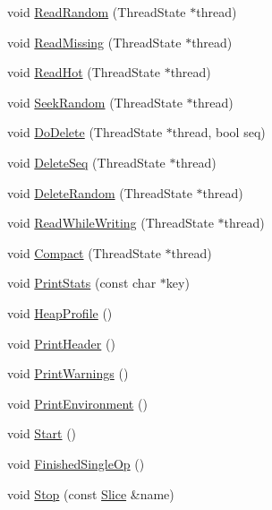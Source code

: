 \begin{DoxyCompactItemize}
\item 
void \hyperlink{classleveldb_1_1_benchmark_abef1498fff747eb738dd8d6ab438d3f7}{Read\+Random} (Thread\+State $\ast$thread)
\item 
void \hyperlink{classleveldb_1_1_benchmark_a03029862416a43d2e8c25b8615ba83a2}{Read\+Missing} (Thread\+State $\ast$thread)
\item 
void \hyperlink{classleveldb_1_1_benchmark_a2a3d0a13c1d410071a0a324cf3c57603}{Read\+Hot} (Thread\+State $\ast$thread)
\item 
void \hyperlink{classleveldb_1_1_benchmark_ab81f03204b210d1a3565fa0c8b81a9c8}{Seek\+Random} (Thread\+State $\ast$thread)
\item 
void \hyperlink{classleveldb_1_1_benchmark_a987ec13830ab5ac11f152b23c6bddc95}{Do\+Delete} (Thread\+State $\ast$thread, bool seq)
\item 
void \hyperlink{classleveldb_1_1_benchmark_a56edb0a3157cbc6c4d53b7c2bba7500d}{Delete\+Seq} (Thread\+State $\ast$thread)
\item 
void \hyperlink{classleveldb_1_1_benchmark_a3c8a9018862c652e48830cdb38269060}{Delete\+Random} (Thread\+State $\ast$thread)
\item 
void \hyperlink{classleveldb_1_1_benchmark_a8373efcda4c0e141343b5ee9182df17e}{Read\+While\+Writing} (Thread\+State $\ast$thread)
\item 
void \hyperlink{classleveldb_1_1_benchmark_a4038073777f89d101a0ab308eaa2d1fc}{Compact} (Thread\+State $\ast$thread)
\item 
void \hyperlink{classleveldb_1_1_benchmark_a9588df1fc4ab1247a2bacb4a2c641f35}{Print\+Stats} (const char $\ast$key)
\item 
void \hyperlink{classleveldb_1_1_benchmark_aa7050ec2b08b3a47315a6d2d969b5119}{Heap\+Profile} ()
\item 
void \hyperlink{classleveldb_1_1_benchmark_a15b286cc29560860abc89217e4b5c079}{Print\+Header} ()
\item 
void \hyperlink{classleveldb_1_1_benchmark_aa0b2a30493347ff50cbf28772cfaca9d}{Print\+Warnings} ()
\item 
void \hyperlink{classleveldb_1_1_benchmark_ac99c8911fbe6bc43acd785cf28d3f5a7}{Print\+Environment} ()
\item 
void \hyperlink{classleveldb_1_1_benchmark_a425b045a0e0adc6bf680e5928bbe6047}{Start} ()
\item 
void \hyperlink{classleveldb_1_1_benchmark_acca3e72cfbf640d11acae8d58344ee48}{Finished\+Single\+Op} ()
\item 
void \hyperlink{classleveldb_1_1_benchmark_a65d0797253a00efc34b160a59aeb77c1}{Stop} (const \hyperlink{classleveldb_1_1_slice}{Slice} \&name)

\end{DoxyCompactItemize}
